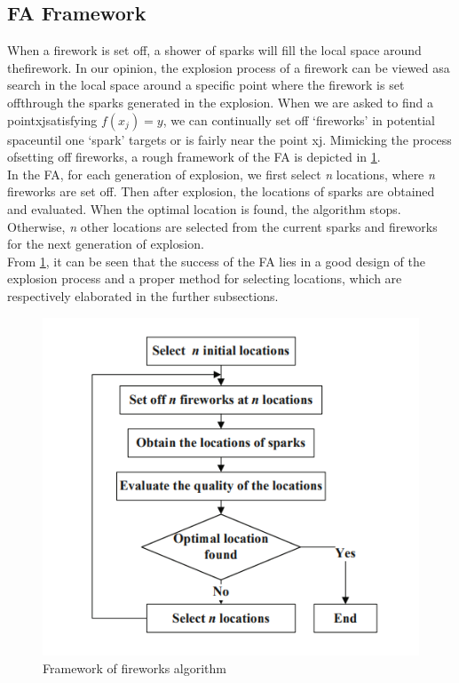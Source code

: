 \documentclass[11pt, a4paper]{report}
\begin{document}
\subsection{FA Framework}

When a ﬁrework is set off, a shower of sparks will ﬁll the local space around theﬁrework. In our opinion, the explosion process of a ﬁrework can be viewed asa search in the local space around a speciﬁc point where the ﬁrework is set oﬀthrough the sparks generated in the explosion. When we are asked to ﬁnd a pointxjsatisfying $ f(x_{j})=y $, we can continually set oﬀ ‘ﬁreworks’ in potential spaceuntil one ‘spark’ targets or is fairly near the point xj. Mimicking the process ofsetting oﬀ ﬁreworks, a rough framework of the FA is depicted in \ref{fig:FAFramework}. \\

In the FA, for each generation of explosion, we first select \textit{n} locations, where \textit{n} fireworks are set off. Then after explosion, the locations of sparks are obtained and evaluated. When the optimal location is found, the algorithm stops. Otherwise, \textit{n} other locations are selected from the current sparks and fireworks for the next generation of explosion.
\\
From \ref{fig:FAFramework}, it can be seen that the success of the FA lies in a good design
of the explosion process and a proper method for selecting locations, which are
respectively elaborated in the further subsections.

\newpage
	\begin{figure}[!bth]
	\center
	\includegraphics[scale=0.5]{images/FA_flowchart.png}
	\caption[Framework of fireworks algorithm]{Framework of fireworks algorithm \cite{paper:fwa}}
	\label{fig:FAFramework}
	\end{figure}
\end{document}
